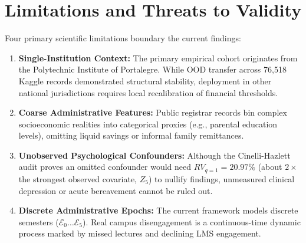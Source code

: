 \section{Limitations and Threats to Validity}
\label{sec:concl_limitations}

Four primary scientific limitations boundary the current findings:
\begin{enumerate}
    \item \textbf{Single-Institution Context:} The primary empirical cohort originates from the Polytechnic Institute of Portalegre. While OOD transfer across 76,518 Kaggle records demonstrated structural stability, deployment in other national jurisdictions requires local recalibration of financial thresholds.
    \item \textbf{Coarse Administrative Features:} Public registrar records bin complex socioeconomic realities into categorical proxies (e.g., parental education levels), omitting liquid savings or informal family remittances.
    \item \textbf{Unobserved Psychological Confounders:} Although the Cinelli-Hazlett audit proves an omitted confounder would need $RV_{q=1} = 20.97\%$ (about $2\times$ the strongest observed covariate, $Z_5$) to nullify findings, unmeasured clinical depression or acute bereavement cannot be ruled out.
    \item \textbf{Discrete Administrative Epochs:} The current framework models discrete semesters ($\mathcal{E}_0 \dots \mathcal{E}_5$). Real campus disengagement is a continuous-time dynamic process marked by missed lectures and declining LMS engagement.
\end{enumerate}
